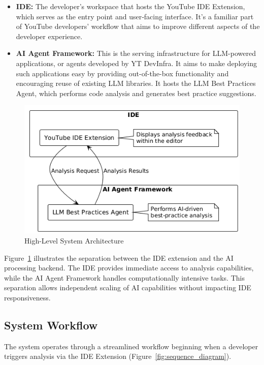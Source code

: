 \begin{spacing}{1.2}
\begin{itemize}
    \item \textbf{IDE:} The developer's workspace that hosts the YouTube IDE Extension, which serves as the entry point and user‑facing interface. It's a familiar part of YouTube developers' workflow that aims to improve different aspects of the developer experience.
    \item \textbf{AI Agent Framework:} This is the serving infrastructure for LLM-powered applications, or agents developed by YT DevInfra. It aims to make deploying such applications easy by providing out-of-the-box functionality and encouraging reuse of existing LLM libraries. It hosts the LLM Best Practices Agent, which performs code analysis and generates best practice suggestions.
\end{itemize}

\begin{figure}[H]
\centering
\includegraphics[scale=0.7]{images/high_level_system_architecture.png}
\caption{High-Level System Architecture}
\label{fig:system_architecture}
\end{figure}

Figure~\ref{fig:system_architecture} illustrates the separation between the IDE extension and the AI processing backend. The IDE provides immediate access to analysis capabilities, while the AI Agent Framework handles computationally intensive tasks. This separation allows independent scaling of AI capabilities without impacting IDE responsiveness.

\subsection{System Workflow}
The system operates through a streamlined workflow beginning when a developer triggers analysis via the IDE Extension (Figure~\ref{fig:sequence_diagram}).


\end{spacing}
